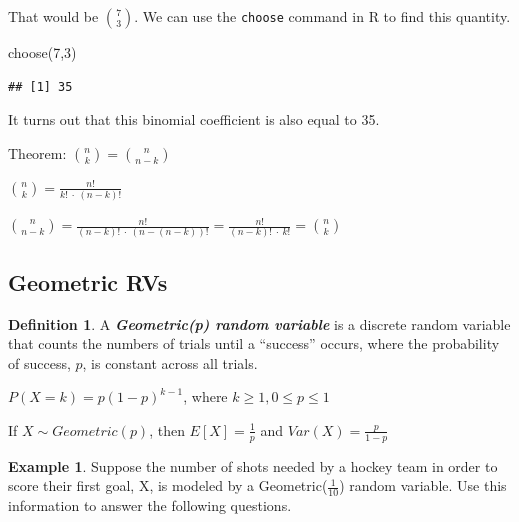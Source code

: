 \documentclass[
  11pt,
]{book}
\newenvironment{Shaded}{\begin{snugshade}}{\end{snugshade}}
\newcommand{\DecValTok}[1]{\textcolor[rgb]{0.00,0.00,0.81}{#1}}
\newcommand{\FunctionTok}[1]{\textcolor[rgb]{0.00,0.00,0.00}{#1}}
\newcommand{\NormalTok}[1]{#1}
\theoremstyle{definition}
\newtheorem{definition}{Definition}[chapter]
\theoremstyle{definition}
\newtheorem{example}{Example}[chapter]
\theoremstyle{definition}
\theoremstyle{definition}
\theoremstyle{remark}
\begin{document}
That would be \(\binom{7}{3}\). We can use the \texttt{choose} command in R to find this quantity.

\begin{Shaded}
\begin{Highlighting}[]
\FunctionTok{choose}\NormalTok{(}\DecValTok{7}\NormalTok{,}\DecValTok{3}\NormalTok{)}
\end{Highlighting}
\end{Shaded}

\begin{verbatim}
## [1] 35
\end{verbatim}

It turns out that this binomial coefficient is also equal to 35.

Theorem: \(\binom{n}{k} = \binom{n}{n-k}\)

\(\binom{n}{k} = \frac{n!}{k!\ \cdot\ (n-k)!}\)

\(\binom{n}{n-k} = \frac{n!}{(n-k)!\ \cdot\ (n-(n-k))!} = \frac{n!}{(n-k)!\ \cdot\ k!} = \binom{n}{k}\)

\newpage

\hypertarget{geometric-rvs}{%
\subsection{Geometric RVs}\label{geometric-rvs}}

\begin{definition}
A \textbf{\emph{Geometric(p) random variable}} is a discrete random variable that counts the numbers of trials until a ``success'' occurs, where the probability of success, \(p\), is constant across all trials.

\(P(X=k) = p(1-p)^{k-1}\), where \(k \geq 1, 0 \leq p \leq 1\)

If \(X \sim Geometric(p)\), then \(E[X]=\frac{1}{p}\) and \(Var(X)=\frac{p}{1-p}\)
\end{definition}

\begin{example}
Suppose the number of shots needed by a hockey team in order to score their first goal, X, is modeled by a Geometric(\(\frac{1}{10}\)) random variable. Use this information to answer the following questions.
\end{example}
\end{document}
